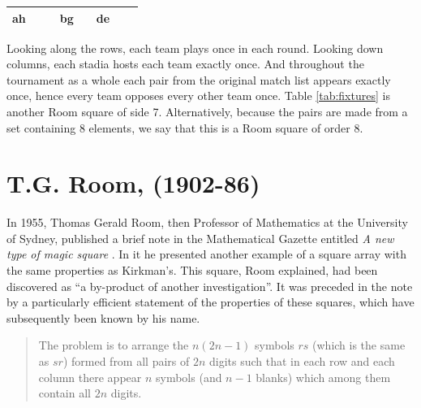 \documentclass[
  11pt,
  a4paper]{book}
\begin{document}
\begin{longtable}[]{@{}cccccccc@{}}
\begin{minipage}[t]{0.05\columnwidth}
ah\strut
\end{minipage} & \begin{minipage}[t]{0.05\columnwidth}\centering
\strut
\end{minipage} & \begin{minipage}[t]{0.05\columnwidth}\centering
\strut
\end{minipage} & \begin{minipage}[t]{0.05\columnwidth}\centering
bg\strut
\end{minipage} & \begin{minipage}[t]{0.05\columnwidth}\centering
\strut
\end{minipage} & \begin{minipage}[t]{0.05\columnwidth}\centering
de\strut
\end{minipage}\tabularnewline
\bottomrule
\end{longtable}

Looking along the rows, each team plays once in each round. Looking down
columns, each stadia hosts each team exactly once. And throughout the
tournament as a whole each pair from the original match list appears
exactly once, hence every team opposes every other team once. Table
\ref{tab:fixtures}
is another Room square of side 7. Alternatively, because the pairs are
made from a set containing 8 elements, we say that this is a Room square
of order 8.

\hypertarget{t.g.-room-1902-86}{%
\section{T.G. Room, (1902-86)}\label{t.g.-room-1902-86}}

In 1955, Thomas Gerald Room, then Professor of Mathematics at the
University of Sydney, published a brief note in the Mathematical Gazette
entitled \emph{A new type of magic square}
\autocite{room_2569_1955}.
In it he presented another
example of a square array with the same properties as Kirkman's. This
square, Room explained, had been discovered as ``a by-product of
another investigation''. It was preceded in the note by a particularly
efficient statement of the properties of these squares, which have
subsequently been known by his name.

\begin{quote}
The problem is to arrange the \(n(2n-1)\) symbols \(rs\) (which is the
same as \(sr\)) formed from all pairs of \(2n\) digits such that in each
row and each column there appear \(n\) symbols (and \(n-1\) blanks) which
among them contain all \(2n\) digits.
\end{quote}
\end{document}
